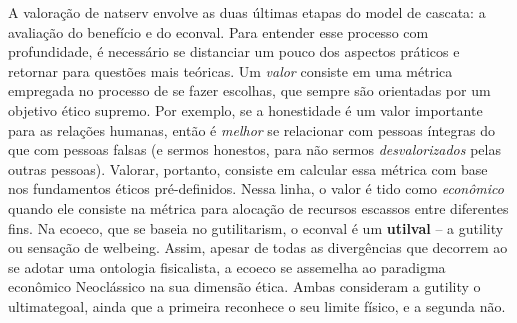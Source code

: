\documentclass[./main.tex]{subfiles}
\begin{document}
\par A valoração de \gls{natserv} envolve as duas últimas etapas do \gls{model} de cascata: a avaliação do benefício e do \gls{econval}. Para entender esse processo com profundidade, é necessário se distanciar um pouco dos aspectos práticos e retornar para questões mais teóricas. Um \textit{valor} consiste em uma métrica empregada no processo de se fazer escolhas, que sempre são orientadas por um objetivo ético supremo. Por exemplo, se a honestidade é um valor importante para as relações humanas, então é \textit{melhor} se relacionar com pessoas íntegras do que com pessoas falsas (e sermos honestos, para não sermos \textit{desvalorizados} pelas outras pessoas). Valorar, portanto, consiste em calcular essa métrica com base nos fundamentos éticos pré-definidos. Nessa linha, o valor é tido como \textit{econômico} quando ele consiste na métrica para alocação de recursos escassos entre diferentes fins. Na \gls{ecoeco}, que se baseia no \gls{gutilitarism}, o \gls{econval} é um \textbf{\gls{utilval}} -- a \gls{gutility} ou sensação de \gls{welbeing}. Assim, apesar de todas as divergências que decorrem ao se adotar uma ontologia fisicalista, a \gls{ecoeco} se assemelha ao \gls{paradigma} econômico Neoclássico na sua dimensão ética. Ambas consideram a \gls{gutility} o \gls{ultimategoal}, ainda que a primeira reconhece o seu limite físico, e a segunda não.
\end{document}

